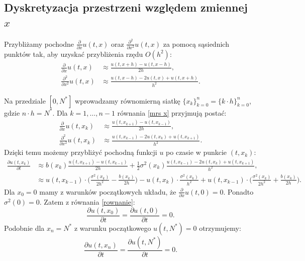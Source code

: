 \documentclass{article}
\begin{document}
\subsection{Dyskretyzacja przestrzeni względem zmiennej $x$}\label{mrs dys}

Przybliżamy pochodne \(\frac{\partial}{\partial x} u(t, x)\) oraz \(\frac{\partial^{2}}{\partial {x}^{2}} u(t, x)\) za pomocą sąsiednich punktów tak, aby uzyskać przybliżenia rzędu $O(h^2)$:
\begin{equation}\label{mrs x}
\begin{aligned}
\frac{\partial}{\partial x} u(t, x) &\approx \frac{u(t, x+h) - u(t, x-h)}{2 h}, \\
\frac{\partial^{2}}{\partial {x}^{2}} u(t, x) &\approx \frac{u(t, x-h) - 2u(t,x)+u(t, x+h)}{h^{2}}.
\end{aligned}
\end{equation}

Na przedziale $[0, N^{*}]$ wprowadzamy równomierną siatkę $\{x_k\}_{k=0}^{n} = \{k\cdot h\}_{k=0}^{n}$, gdzie $n\cdot h = N^{*}$. Dla $k=1,\dots,n-1$ równania \eqref{mrs x} przyjmują postać:
\begin{equation*}
\begin{aligned}
\frac{\partial}{\partial x} u(t, x_{k}) &\approx \frac{u(t, x_{k+1}) - u(t, x_{k-1})}{2 h}, \\
\frac{\partial^{2}}{\partial {x}^{2}} u(t, x_{k}) &\approx \frac{u(t, x_{k-1}) - 2u(t,x_{k})+u(t, x_{k+1})}{h^{2}}.
\end{aligned}
\end{equation*}
Dzięki temu możemy przybliżyć pochodną funkcji $u$ po czasie w punkcie $(t,x_k)$:
\begin{equation}\label{mrs xk}
\begin{aligned}
\frac{\partial u(t, x_k)}{\partial t} &\approx b(x_{k}) \frac{u(t, x_{k+1}) - u(t, x_{k-1})}{2 h} + \frac{1}{2} \sigma^{2}(x_{k}) \frac{u(t, x_{k-1}) - 2u(t,x_{k})+u(t, x_{k+1})}{h^{2}},\\
&\approx u(t, x_{k-1})\cdot\Big(\frac{\sigma^{2}(x_{k})}{2h^{2}} -\frac{b(x_{k})}{2h}\Big) - u(t,x_{k})\cdot\frac{\sigma^{2}(x_{k})}{h^{2}} + u(t,x_{k-1}) \cdot\Big(\frac{\sigma^{2}(x_{k})}{2h^{2}} +\frac{b(x_{k})}{2h}\Big).
\end{aligned}
\end{equation}
Dla $x_0 = 0$ mamy z warunków początkowych układu, że $\frac{\partial}{\partial x} u(t, 0) = 0$. Ponadto $\sigma^{2}(0) = 0$. Zatem z równania \eqref{rownanie}:
\begin{equation}\label{mrs x0}
\frac{\partial u(t, x_{0})}{\partial t} = \frac{\partial u(t, 0)}{\partial t} = 0.
\end{equation}
Podobnie dla $x_{n} = N^{*}$ z warunku początkowego $u(t, N^{*}) = 0$ otrzymujemy:
\begin{equation}\label{mrs xn}
\frac{\partial u(t, x_{n})}{\partial t} = \frac{\partial u(t, N^{*})}{\partial t} = 0.
\end{equation}
\end{document}
